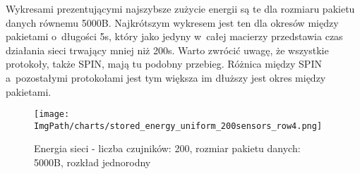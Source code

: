 Wykresami prezentującymi najszybsze zużycie energii są te dla rozmiaru pakietu danych równemu 5000B. Najkrótszym wykresem jest ten dla okresów między pakietami o~długości 5s, który jako jedyny w~całej macierzy przedstawia czas działania sieci trwający mniej niż 200s. Warto zwrócić uwagę, że wszystkie protokoły, także SPIN, mają tu podobny przebieg. Różnica między SPIN a~pozostałymi protokołami jest tym większa im dłuższy jest okres między pakietami.


\begin{figure}[H]
	\begin{center}
		\texttt{[image: \\ImgPath/charts/stored\_energy\_uniform\_200sensors\_row4.png]}
	\end{center}
	\caption{Energia sieci - liczba czujników: 200, rozmiar pakietu danych: 5000B, rozkład jednorodny}
\end{figure}
